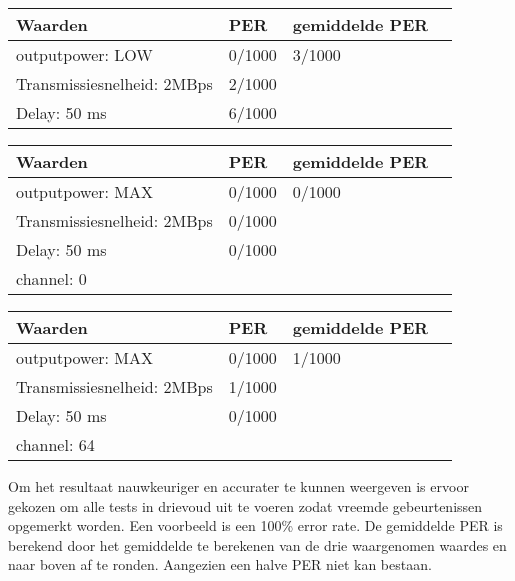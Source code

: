 \documentclass{article}
\begin{document}
\begin{center}
    \begin{tabular}{ | l | l | l | p{5cm} |}
    \hline
    Waarden & PER & gemiddelde PER\\ \hline
    outputpower: LOW & 0/1000 & 3/1000\\ \hline
    Transmissiesnelheid: 2MBps & 2/1000 &   \\ \hline
    Delay: 50 ms & 6/1000 &  \\
    \hline
    \end{tabular}
\end{center} 
\begin{center}
    \begin{tabular}{ | l | l | l | p{5cm} |}
    \hline
    Waarden & PER & gemiddelde PER\\ \hline
    outputpower: MAX & 0/1000 &  0/1000\\ \hline
    Transmissiesnelheid: 2MBps & 0/1000 &   \\ \hline
    Delay: 50 ms & 0/1000 &  \\
    \hline
    channel: 0 &  &  \\ \hline
    \end{tabular}
\end{center} 
\begin{center}
    \begin{tabular}{ | l | l | l | p{5cm} |}
    \hline
    Waarden & PER & gemiddelde PER\\ \hline
    outputpower: MAX & 0/1000 & 1/1000\\ \hline
    Transmissiesnelheid: 2MBps & 1/1000 &  \\ \hline
    Delay: 50 ms & 0/1000 &  \\
    \hline
    channel: 64 &  &  \\ \hline
    \end{tabular}
\end{center} 

Om het resultaat nauwkeuriger en accurater te kunnen weergeven is ervoor gekozen om alle tests in drievoud uit te voeren zodat vreemde gebeurtenissen opgemerkt worden. Een voorbeeld is een 100\% error rate.
\newline 
De gemiddelde PER is berekend door het gemiddelde te berekenen van de drie waargenomen waardes en naar boven af te ronden. Aangezien een halve PER niet kan bestaan. 
\end{document}
